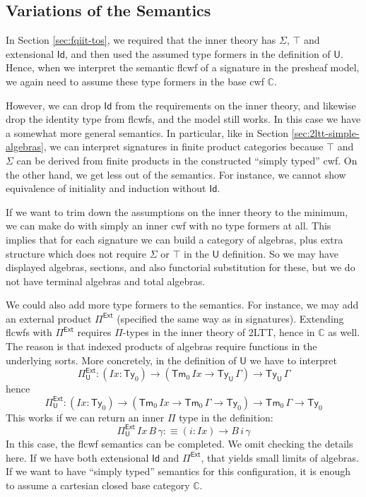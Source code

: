 \documentclass[12pt,a4paper,twoside,openany]{book}
\theoremstyle{remark}
\theoremstyle{definition}
\theoremstyle{theorem}
\newcommand{\mi}[1]{\mathit{#1}}
\newcommand{\mbb}[1]{\mathbb{#1}}
\newcommand{\bs}[1]{\boldsymbol{#1}}
\newcommand{\Ix}{\mi{Ix}}
\newcommand{\Tm}{\mathsf{Tm}}
\newcommand{\Ty}{\mathsf{Ty}}
\newcommand{\U}{\mathsf{U}}
\newcommand{\Id}{\mathsf{Id}}
\newcommand{\Pie}{\Pi^{\mathsf{Ext}}}
\newcommand{\bU}{\bs{\U}}
\newcommand{\mbbC}{\mbb{C}}
\newcommand{\defn}{:\equiv}
\begin{document}
\subsection{Variations of the Semantics}
\label{sec:fqii-variations}

In Section \ref{sec:fqiit-tos}, we required that the inner theory has $\Sigma$,
$\top$ and extensional $\Id$, and then used the assumed type formers in the
definition of $\bU$. Hence, when we interpret the semantic flcwf of a signature
in the presheaf model, we again need to assume these type formers in the base
cwf $\mbbC$.

However, we can drop $\Id$ from the requirements on the inner theory, and
likewise drop the identity type from flcwfs, and the model still works. In this
case we have a somewhat more general semantics. In particular, like in Section
\ref{sec:2ltt-simple-algebras}, we can interpret signatures in finite product
categories because $\top$ and $\Sigma$ can be derived from finite products in
the constructed ``simply typed'' cwf. On the other hand, we get less out of the
semantics. For instance, we cannot show equivalence of initiality and induction
without $\Id$.

If we want to trim down the assumptions on the inner theory to the minimum, we
can make do with simply an inner cwf with no type formers at all. This
implies that for each signature we can build a category of algebras, plus extra
structure which does not require $\Sigma$ or $\top$ in the $\bU$ definition. So
we may have displayed algebras, sections, and also functorial substitution for
these, but we do not have terminal algebras and total algebras.

We could also add more type formers to the semantics. For instance, we may add
an external product $\Pie$ (specified the same way as in signatures). Extending
flcwfs with $\Pie$ requires $\Pi$-types in the inner theory of 2LTT, hence in
$\mbbC$ as well. The reason is that indexed products of algebras require
functions in the underlying sorts. More concretely, in the definition of $\bU$
we have to interpret
\[
  \Pie_{\bU} : (\Ix : \Ty_0) \to (\Tm_0\,\Ix \to \Ty_{\bU}\,\Gamma) \to \Ty_{\bU}\,\Gamma
\]
hence
\[
  \Pie_{\bU} : (\Ix : \Ty_0) \to (\Tm_0\,\Ix \to \Tm_0\,\Gamma \to \Ty_0) \to \Tm_0\,\Gamma \to \Ty_0
\]
This works if we can return an inner $\Pi$ type in the definition:
\[
  \Pie_{\bU}\,\Ix\,B\,\gamma \defn (i : \Ix) \to B\,i\,\gamma
  \]
In this case, the flcwf semantics can be completed. We omit checking the details
here. If we have both extensional $\Id$ and $\Pie$, that yields small limits of algebras. If
we want to have ``simply typed'' semantics for this configuration, it is enough
to assume a cartesian closed base category $\mbbC$.
\end{document}
